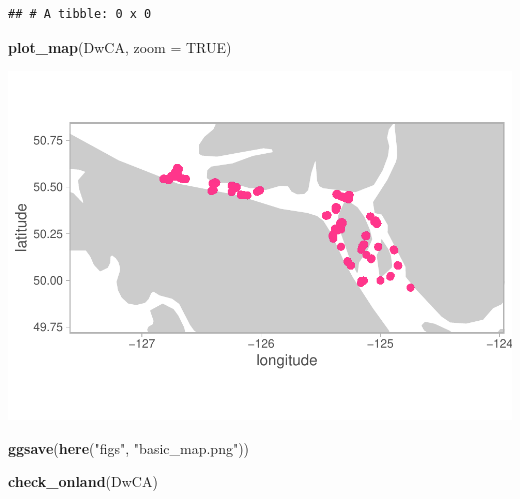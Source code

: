 \documentclass[]{book}
\newenvironment{Shaded}{\begin{snugshade}}{\end{snugshade}}
\newcommand{\DataTypeTok}[1]{\textcolor[rgb]{0.13,0.29,0.53}{#1}}
\newcommand{\KeywordTok}[1]{\textcolor[rgb]{0.13,0.29,0.53}{\textbf{#1}}}
\newcommand{\NormalTok}[1]{#1}
\newcommand{\OtherTok}[1]{\textcolor[rgb]{0.56,0.35,0.01}{#1}}
\newcommand{\StringTok}[1]{\textcolor[rgb]{0.31,0.60,0.02}{#1}}
\begin{document}
\begin{verbatim}
## # A tibble: 0 x 0
\end{verbatim}

\begin{Shaded}
\begin{Highlighting}[]
\KeywordTok{plot_map}\NormalTok{(DwCA, }\DataTypeTok{zoom =} \OtherTok{TRUE}\NormalTok{)}
\end{Highlighting}
\end{Shaded}

\includegraphics{03-application_files/figure-latex/unnamed-chunk-3-1.pdf}

\begin{Shaded}
\begin{Highlighting}[]
\KeywordTok{ggsave}\NormalTok{(}\KeywordTok{here}\NormalTok{(}\StringTok{"figs"}\NormalTok{, }\StringTok{"basic_map.png"}\NormalTok{))}

\KeywordTok{check_onland}\NormalTok{(DwCA)}
\end{Highlighting}
\end{Shaded}
\end{document}
